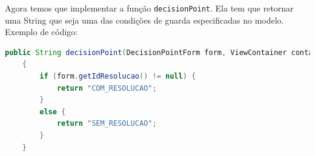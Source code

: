 Agora temos que implementar a função \texttt{decisionPoint}. Ela tem que
retornar uma String que seja uma das condições de guarda especificadas no
modelo. Exemplo de código:

\begin{lstlisting}[language=java, frame=single, breaklines=true]
	public String decisionPoint(DecisionPointForm form, ViewContainer container) throws Exception
	{
		if (form.getIdResolucao() != null) {
			return "COM_RESOLUCAO";
		}
		else {
			return "SEM_RESOLUCAO";
		}
	}
\end{lstlisting}